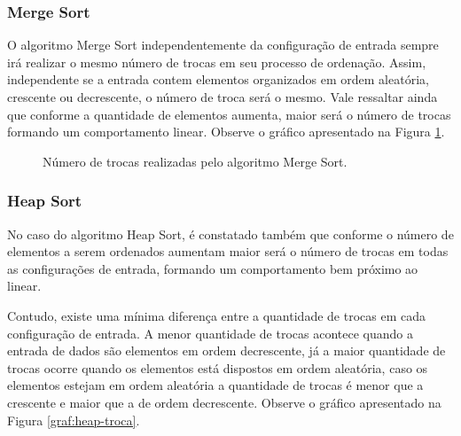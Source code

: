 \documentclass[conference,onecolumn]{IEEEtran}
\begin{document}
\subsubsection{Merge Sort}

O algoritmo Merge Sort independentemente da configuração de entrada sempre irá realizar o mesmo número de trocas em seu processo de ordenação. Assim, independente se a entrada contem elementos organizados em ordem aleatória, crescente ou decrescente, o número de troca será o mesmo. Vale ressaltar ainda que conforme a quantidade de elementos aumenta, maior será o número de trocas formando um comportamento linear. Observe o gráfico apresentado na Figura \ref{graf:merge-troca}.

\begin{figure}[H]
\begin{center}
\end{center}
\caption{Número de trocas realizadas pelo algoritmo Merge Sort.}
\label{graf:merge-troca}
\end{figure}

\subsubsection{Heap Sort}

No caso do algoritmo Heap Sort, é constatado também que conforme o número de elementos a serem ordenados aumentam maior será o número de trocas em todas as configurações de entrada, formando um comportamento bem próximo ao linear. 

Contudo, existe uma mínima diferença entre a quantidade de trocas em cada configuração de entrada. A menor quantidade de trocas acontece quando a entrada de dados são elementos em ordem decrescente, já a maior quantidade de trocas ocorre quando os elementos está dispostos em ordem aleatória, caso os elementos estejam em ordem aleatória a quantidade de trocas é menor que a crescente e maior que a de ordem decrescente. Observe o gráfico apresentado na Figura \ref{graf:heap-troca}.
\end{document}
